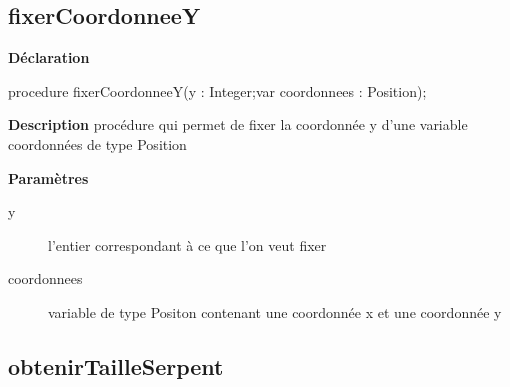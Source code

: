 \documentclass{report}
\newif\ifpdf
\begin{document}
\subsection*{fixerCoordonneeY}
\fi
\label{Types-fixerCoordonneeY}
\begin{list}{}{
\setlength{\itemindent}{0cm}
\setlength{\listparindent}{0cm}
\setlength{\leftmargin}{\evensidemargin}
\addtolength{\leftmargin}{\tmplength}
\settowidth{\labelsep}{X}
\addtolength{\leftmargin}{\labelsep}
\setlength{\labelwidth}{\tmplength}
}
\item[\textbf{Déclaration}\hfill]
\ifpdf
\begin{flushleft}
\fi
\begin{ttfamily}
procedure fixerCoordonneeY(y : Integer;var coordonnees : Position);\end{ttfamily}

\ifpdf
\end{flushleft}
\fi

\par
\item[\textbf{Description}]
procédure qui permet de fixer la coordonnée y d'une variable coordonnées de type Position  \par
\item[\textbf{Paramètres}]
\begin{description}
\item[y] l'entier correspondant à ce que l'on veut fixer
\item[coordonnees] variable de type Positon contenant une coordonnée x et une coordonnée y
\end{description}


\end{list}
\ifpdf
\subsection*{\large{\textbf{obtenirTailleSerpent}}\normalsize\hspace{1ex}\hrulefill}
\else
\end{document}
